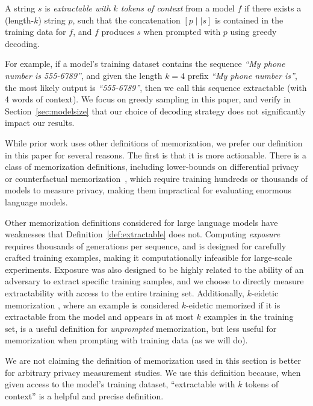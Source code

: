 %
\begin{definition}
A string $s$ is \emph{extractable with $k$ tokens of context} from a model $f$ if there exists a (length-$k$) string $p$, such that the concatenation $[p \mid \mid s]$ is contained in the training data for $f$, and $f$ produces $s$ when prompted with $p$ using greedy decoding.
\label{def:extractable}
\end{definition}

For example, if a model's training dataset contains the sequence \textit{``My phone number is 555-6789''},
and given the length $k=4$ prefix \textit{``My phone number is''}, the most likely output is \textit{``555-6789''}, then we call this sequence extractable (with 4 words of context).
%
We focus on greedy sampling in this paper, and verify in Section~\ref{sec:modelsize} that our choice of decoding strategy does not significantly impact our results.

While prior work uses other definitions of memorization, we prefer our definition in this paper for several reasons.
%
The first is that it is more actionable.
%
There is a class of memorization definitions, including lower-bounds on differential privacy~\citep{dwork2006calibrating, jagielski2020auditing, nasr2021adversary} or counterfactual memorization~\citep{feldman2020neural, zhang2021counterfactual}, which require training hundreds or thousands of models to measure privacy, 
making them impractical for evaluating enormous language models. 

Other memorization definitions considered for large language models have weaknesses that Definition~\ref{def:extractable} does not. 
Computing \emph{exposure} \citep{carlini2019secret} requires thousands of generations per sequence, and is designed for carefully crafted training examples, making it computationally infeasible for large-scale experiments.
Exposure was also designed to be highly related to the ability of an adversary to extract specific training samples, and we choose to directly measure extractability with access to the entire training set.
Additionally, $k$-eidetic memorization \citep{carlini2020extracting}, where an example is considered $k$-eidetic memorized if it is extractable from the model and appears in at most $k$ examples in the training set,
is a useful definition for \emph{unprompted} memorization, but less useful for memorization when prompting with training data (as we will do).

We are not claiming the definition of memorization used in this section is better for arbitrary privacy measurement
studies.
We use this definition because, when given access to the model's training dataset, ``extractable with $k$ tokens of context''
is a helpful and precise definition.


